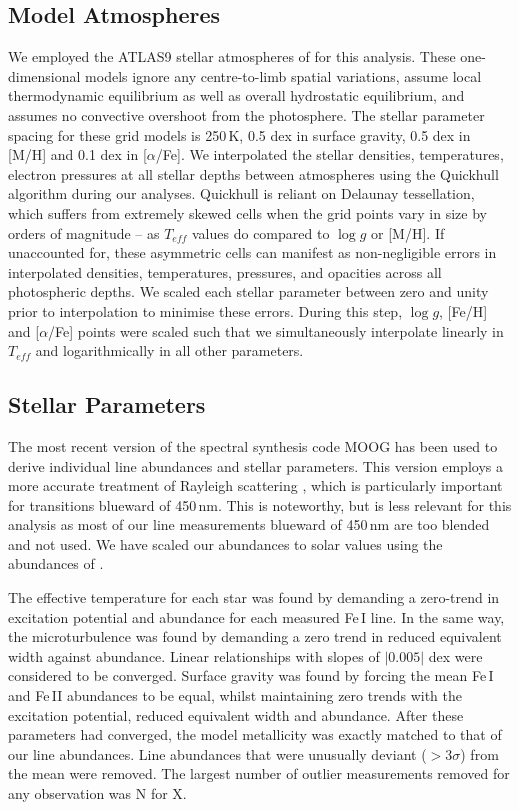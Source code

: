 \documentclass{emulateapj}
\begin{document}


\subsection{Model Atmospheres}
We employed the ATLAS9 stellar atmospheres of \citet{Castelli;Kurucz_2003} for this analysis. These one-dimensional models ignore any centre-to-limb spatial variations, assume local thermodynamic equilibrium as well as overall hydrostatic equilibrium, and assumes no convective overshoot from the photosphere. The stellar parameter spacing for these grid models is 250\,K, 0.5 dex in surface gravity, 0.5 dex in [M/H] and 0.1 dex in [$\alpha$/Fe]. We interpolated the stellar densities, temperatures, electron pressures at all stellar depths between atmospheres using the Quickhull algorithm during our analyses. Quickhull is reliant on Delaunay tessellation, which suffers from extremely skewed cells when the grid points vary in size by orders of magnitude -- as $T_{eff}$ values do compared to $\log{g}$ or [M/H]. If unaccounted for, these asymmetric cells can manifest as non-negligible errors in interpolated densities, temperatures, pressures, and opacities across all photospheric depths. We scaled each stellar parameter between zero and unity prior to interpolation to minimise these errors. During this step, $\log{g}$, [Fe/H] and [$\alpha$/Fe] points were scaled such that we simultaneously interpolate linearly in $T_{eff}$ and logarithmically in all other parameters.

\subsection{Stellar Parameters}
The most recent version of the spectral synthesis code MOOG \citep{Sneden;et-al_1973} has been used to derive individual line abundances and stellar parameters. This version employs a more accurate treatment of Rayleigh scattering \citet{Sobeck;et-al_2011}, which is particularly important for transitions blueward of 450\,nm. This is noteworthy, but is less relevant for this analysis as most of our line measurements blueward of 450\,nm are too blended and not used. We have scaled our abundances to solar values using the abundances of \citet{Asplund;et-al_2009}.

The effective temperature for each star was found by demanding a zero-trend in excitation potential and abundance for each measured Fe\,I line. In the same way, the microturbulence was found by demanding a zero trend in reduced equivalent width against abundance. Linear relationships with slopes of $|0.005|$ dex were considered to be converged. Surface gravity was found by forcing the mean Fe\,I and Fe\,II abundances to be equal, whilst maintaining zero trends with the excitation potential, reduced equivalent width and abundance. After these parameters had converged, the model metallicity was exactly matched to that of our line abundances. Line abundances that were unusually deviant ($>3\sigma$) from the mean were removed. The largest number of outlier measurements removed for any observation was N for X.
\end{document}
